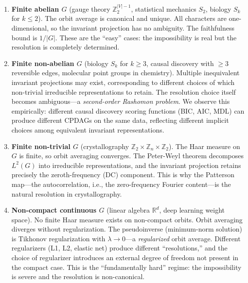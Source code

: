 \documentclass[11pt,a4paper]{article}
\begin{document}
\begin{enumerate}
  \item \textbf{Finite abelian $G$} (gauge theory $\mathbb{Z}_2^{|V|-1}$,
    statistical mechanics $S_2$, biology $S_k$ for $k \leq 2$).
    The orbit average is canonical and unique.  All characters are
    one-dimensional, so the invariant projection has no ambiguity.
    The faithfulness bound is $1/|G|$.  These are the ``easy'' cases:
    the impossibility is real but the resolution is completely determined.

  \item \textbf{Finite non-abelian $G$} (biology $S_k$ for $k \geq 3$,
    causal discovery with $\geq 3$ reversible edges, molecular point groups in chemistry).
    Multiple inequivalent invariant projections may exist, corresponding
    to different choices of which non-trivial irreducible representations
    to retain.  The resolution choice itself becomes ambiguous---a
    \emph{second-order Rashomon problem}.  We observe this empirically:
    different causal discovery scoring functions (BIC, AIC, MDL) can
    produce different CPDAGs on the same data, reflecting different
    implicit choices among equivalent invariant representations.

  \item \textbf{Finite non-trivial $G$} (crystallography $\mathbb{Z}_2 \times \mathbb{Z}_n \times \mathbb{Z}_2$).
    The Haar measure on $G$ is finite, so orbit averaging converges.
    The Peter-Weyl theorem decomposes $L^2(G)$ into irreducible
    representations, and the invariant projection retains precisely the
    zeroth-frequency (DC) component.  This is why the Patterson
    map---the autocorrelation, i.e., the zero-frequency Fourier
    content---is the natural resolution in crystallography.

  \item \textbf{Non-compact continuous $G$} (linear algebra $\mathbb{R}^d$,
    deep learning weight space).
    No finite Haar measure exists on non-compact orbits.  Orbit averaging
    diverges without regularization.  The pseudoinverse (minimum-norm
    solution) is Tikhonov regularization with $\lambda \to 0$---a
    \emph{regularized} orbit average.  Different regularizers (L1, L2,
    elastic net) produce different ``resolutions,'' and the choice of
    regularizer introduces an external degree of freedom not present in the
    compact case.  This is the ``fundamentally hard'' regime: the
    impossibility is severe and the resolution is non-canonical.
\end{enumerate}
\end{document}

